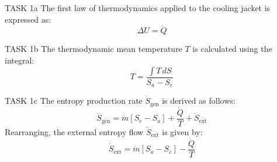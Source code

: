 TASK 1a  
The first law of thermodynamics applied to the cooling jacket is expressed as:  
\[
\Delta U = \dot{Q}
\]

TASK 1b  
The thermodynamic mean temperature \( T \) is calculated using the integral:  
\[
T = \frac{\int T \, dS}{S_a - S_e}
\]

TASK 1c  
The entropy production rate \( \dot{S}_{\text{gen}} \) is derived as follows:  
\[
\dot{S}_{\text{gen}} = \dot{m} \left[ S_e - S_a \right] + \frac{\dot{Q}}{T} + \dot{S}_{\text{ext}}
\]  
Rearranging, the external entropy flow \( \dot{S}_{\text{ext}} \) is given by:  
\[
\dot{S}_{\text{ext}} = \dot{m} \left[ S_a - S_e \right] - \frac{\dot{Q}}{T}
\]